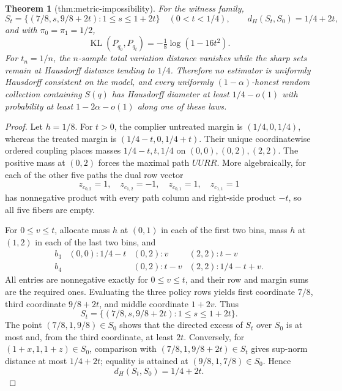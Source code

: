 \documentclass{article}
\newtheorem{theorem}{Theorem}
\begin{document}
\begin{theorem}[thm:metric-impossibility]\label{thm:metric-impossibility}
For the witness family, \[S_t=\{(7/8,s,9/8+2t):1\le s\le1+2t\}\quad(0<t<1/4),\qquad d_H(S_t,S_0)=1/4+2t,\] and with \(\pi_0=\pi_1=1/2\), \[\operatorname{KL}(P_{q_0},P_{q_t})=-\tfrac18\log(1-16t^2).\] For \(t_n=1/n\), the \(n\)-sample total variation distance vanishes while the sharp sets remain at Hausdorff distance tending to \(1/4\). Therefore no estimator is uniformly Hausdorff consistent on the model, and every uniformly \((1-\alpha)\)-honest random collection containing \(S(q)\) has Hausdorff diameter at least \(1/4-o(1)\) with probability at least \(1-2\alpha-o(1)\) along one of these laws.
\end{theorem}
\begin{proof}
Let \(h=1/8\).  For \(t>0\), the complier untreated margin is \((1/4,0,1/4)\), whereas the treated margin is \((1/4-t,0,1/4+t)\).  Their unique coordinatewise ordered coupling places masses \(1/4-t,t,1/4\) on \((0,0),(0,2),(2,2)\).  The positive mass at \((0,2)\) forces the maximal path \(UURR\).  More algebraically, for each of the other five paths the dual row vector
\[
z_{c_{0,2}}=1,\quad z_{c_{1,2}}=-1,\quad
z_{c_{0,1}}=1,\quad z_{c_{1,1}}=1
\]
has nonnegative product with every path column and right-side product \(-t\), so all five fibers are empty.

For \(0\le v\le t\), allocate mass \(h\) at \((0,1)\) in each of the first two bins, mass \(h\) at \((1,2)\) in each of the last two bins, and
\[
\begin{array}{c|lll}
b_3&(0,0):1/4-t&(0,2):v&(2,2):t-v\\
b_4&&(0,2):t-v&(2,2):1/4-t+v.
\end{array}
\]
All entries are nonnegative exactly for \(0\le v\le t\), and their row and margin sums are the required ones.  Evaluating the three policy rows yields first coordinate \(7/8\), third coordinate \(9/8+2t\), and middle coordinate \(1+2v\).  Thus
\[
S_t=\{(7/8,s,9/8+2t):1\le s\le1+2t\}.
\]
The point \((7/8,1,9/8)\in S_0\) shows that the directed excess of \(S_t\) over \(S_0\) is at most and, from the third coordinate, at least \(2t\).  Conversely, for \((1+x,1,1+z)\in S_0\), comparison with \((7/8,1,9/8+2t)\in S_t\) gives sup-norm distance at most \(1/4+2t\); equality is attained at \((9/8,1,7/8)\in S_0\).  Hence
\[
d_H(S_t,S_0)=1/4+2t.
\]


\end{proof}
\end{document}
